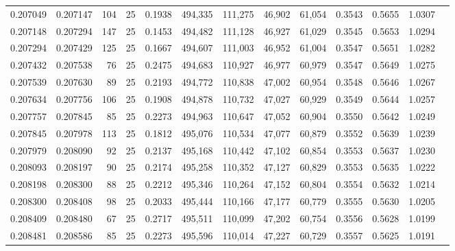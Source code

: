 \begin{tabular}{rrrrrrrrrrrrr}
0.207049 & 0.207147 &   104 &  25 &                                     0.1938 & 494,335 & 111,275 &  46,902 &  61,054 & 0.3543 & 0.5655 & 1.0307 \\
0.207148 & 0.207294 &   147 &  25 &                                     0.1453 & 494,482 & 111,128 &  46,927 &  61,029 & 0.3545 & 0.5653 & 1.0294 \\
0.207294 & 0.207429 &   125 &  25 &                                     0.1667 & 494,607 & 111,003 &  46,952 &  61,004 & 0.3547 & 0.5651 & 1.0282 \\
0.207432 & 0.207538 &    76 &  25 &                                     0.2475 & 494,683 & 110,927 &  46,977 &  60,979 & 0.3547 & 0.5649 & 1.0275 \\
0.207539 & 0.207630 &    89 &  25 &                                     0.2193 & 494,772 & 110,838 &  47,002 &  60,954 & 0.3548 & 0.5646 & 1.0267 \\
0.207634 & 0.207756 &   106 &  25 &                                     0.1908 & 494,878 & 110,732 &  47,027 &  60,929 & 0.3549 & 0.5644 & 1.0257 \\
0.207757 & 0.207845 &    85 &  25 &                                     0.2273 & 494,963 & 110,647 &  47,052 &  60,904 & 0.3550 & 0.5642 & 1.0249 \\
0.207845 & 0.207978 &   113 &  25 &                                     0.1812 & 495,076 & 110,534 &  47,077 &  60,879 & 0.3552 & 0.5639 & 1.0239 \\
0.207979 & 0.208090 &    92 &  25 &                                     0.2137 & 495,168 & 110,442 &  47,102 &  60,854 & 0.3553 & 0.5637 & 1.0230 \\
0.208093 & 0.208197 &    90 &  25 &                                     0.2174 & 495,258 & 110,352 &  47,127 &  60,829 & 0.3553 & 0.5635 & 1.0222 \\
0.208198 & 0.208300 &    88 &  25 &                                     0.2212 & 495,346 & 110,264 &  47,152 &  60,804 & 0.3554 & 0.5632 & 1.0214 \\
0.208300 & 0.208408 &    98 &  25 &                                     0.2033 & 495,444 & 110,166 &  47,177 &  60,779 & 0.3555 & 0.5630 & 1.0205 \\
0.208409 & 0.208480 &    67 &  25 &                                     0.2717 & 495,511 & 110,099 &  47,202 &  60,754 & 0.3556 & 0.5628 & 1.0199 \\
0.208481 & 0.208586 &    85 &  25 &                                     0.2273 & 495,596 & 110,014 &  47,227 &  60,729 & 0.3557 & 0.5625 & 1.0191 \\

\end{tabular}
